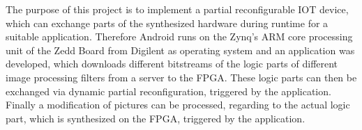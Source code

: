 The purpose of this project is to implement a partial reconfigurable IOT device, which can exchange parts of the synthesized hardware during runtime for a suitable application. Therefore Android runs on the Zynq's ARM core processing unit of the Zedd Board from Digilent as operating system and an application was developed, which downloads different bitstreams of the logic parts of different image processing filters from a server to the FPGA. These logic parts can then be exchanged via dynamic partial reconfiguration, triggered by the application. Finally a modification of pictures can be processed, regarding to the actual logic part, which is synthesized on the FPGA, triggered by the application.